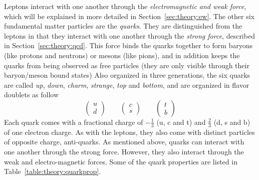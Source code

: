 Leptons interact with one another through the \emph{electromagnetic and weak force}, which will be explained in more detailed in Section~\ref{sec:theory:ew}.\newline
The other six fundamental matter particles are the \emph{quarks}. They are distinguished from the leptons in that they interact with one another through the \emph{strong force}, described in Section~\ref{sec:theory:qcd}. This force binds the quarks together to form baryons (like protons and neutrons) or mesons (like pions), and in addition keeps the quarks from being observed as free particles (they are only visible through their baryon/meson bound states) Also organized in three generations, the six quarks are called \textit{up}, \textit{down}, \textit{charm}, \textit{strange}, \textit{top} and \textit{bottom}, and are organized in flavor doublets as follow
\begin{equation}
\label{eqn:quark_flavor_doublets}
\begin{pmatrix} u \\ d \end{pmatrix} \qquad
\begin{pmatrix} c \\ s \end{pmatrix} \qquad
\begin{pmatrix} t \\ b \end{pmatrix}
\end{equation}
Each quark comes with a fractional charge of $-\frac{1}{3}$ (u, c and t) and $\frac{2}{3}$ (d, s and b) of one electron charge. As with the leptons, they also come with distinct particles of opposite charge, anti-quarks. As mentioned above, quarks can interact with one another through the strong force. However, they also interact through the weak and electro-magnetic forces.
Some of the quark properties are listed in Table~\ref{table:theory:quarkprop}.
